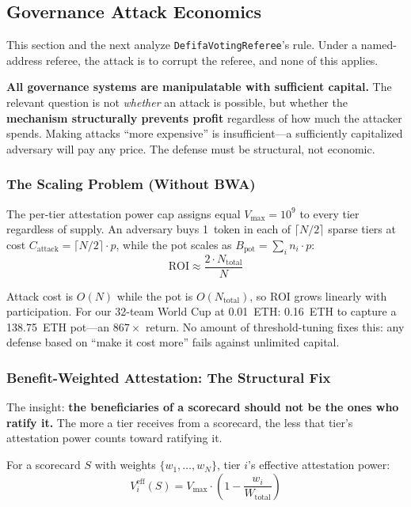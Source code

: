 \documentclass[11pt,a4paper]{article}
\begin{document}
\subsection{Governance Attack Economics}

This section and the next analyze \texttt{DefifaVotingReferee}'s rule. Under a named-address referee, the attack is to corrupt the referee, and none of this applies.

\textbf{All governance systems are manipulatable with sufficient capital.} The relevant question is not \emph{whether} an attack is possible, but whether the \textbf{mechanism structurally prevents profit} regardless of how much the attacker spends. Making attacks ``more expensive'' is insufficient---a sufficiently capitalized adversary will pay any price. The defense must be structural, not economic.

\subsubsection{The Scaling Problem (Without BWA)}

The per-tier attestation power cap assigns equal $V_{\text{max}} = 10^9$ to every tier regardless of supply. An adversary buys 1~token in each of $\lceil N/2 \rceil$ sparse tiers at cost $C_{\text{attack}} = \lceil N/2 \rceil \cdot p$, while the pot scales as $B_{\text{pot}} = \sum_i n_i \cdot p$:
\begin{equation}
\text{ROI} \approx \frac{2 \cdot N_{\text{total}}}{N}
\end{equation}

Attack cost is $O(N)$ while the pot is $O(N_{\text{total}})$, so ROI grows linearly with participation. For our 32-team World Cup at 0.01~ETH: 0.16~ETH to capture a 138.75~ETH pot---an $867\times$ return. No amount of threshold-tuning fixes this: any defense based on ``make it cost more'' fails against unlimited capital.

\subsubsection{Benefit-Weighted Attestation: The Structural Fix}

The insight: \textbf{the beneficiaries of a scorecard should not be the ones who ratify it.} The more a tier receives from a scorecard, the less that tier's attestation power counts toward ratifying it.

For a scorecard $S$ with weights $\{w_1, \ldots, w_N\}$, tier $i$'s effective attestation power:
\begin{equation}\label{eq:bwa}
\boxed{V_i^{\text{eff}}(S) = V_{\text{max}} \cdot \left(1 - \frac{w_i}{W_{\text{total}}}\right)}
\end{equation}
\end{document}
